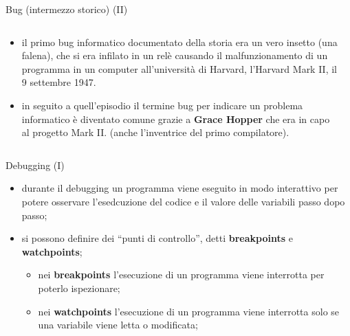 \begin{frame}{Bug (intermezzo storico) (II)}

    \begin{columns}[T]
      \begin{column}{8cm}
	\begin{itemize}
    	  \item il primo bug informatico documentato della storia era un vero insetto (una falena),
	  che si era infilato in un rel\`e causando il malfunzionamento di un programma in un computer
	  all'università di Harvard, l'Harvard Mark II, il 9 settembre 1947. 
	  \item in seguito a quell'episodio il termine bug per indicare un problema informatico è diventato
	  comune grazie a \textbf{Grace Hopper} che era in capo al progetto Mark II.
	  (anche l'inventrice del primo compilatore).
	\end{itemize}
    \end{column}

    \begin{column}[T]{4cm}
	\begin{center}
	\end{center}
    \end{column}
  \end{columns}

\end{frame}

\begin{frame}{Debugging (I)}

  \begin{itemize}
    \item durante il debugging un programma viene eseguito in modo interattivo per potere osservare
    l'esedcuzione del codice e il valore delle variabili passo dopo passo;
    \item si possono definire dei ``punti di controllo'', detti \textbf{breakpoints} e \textbf{watchpoints};
    \begin{itemize}
     \item nei \textbf{breakpoints} l'esecuzione di un programma viene interrotta per poterlo ispezionare;
     \item nei \textbf{watchpoints} l'esecuzione di un programma viene interrotta solo se una variabile
     viene letta o modificata;
    \end{itemize}

  \end{itemize}

\end{frame}

